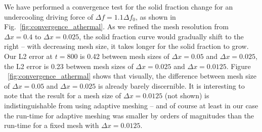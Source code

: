 \documentclass[preprint,12pt]{elsarticle}
\begin{document}
We have performed a convergence test for the solid fraction change for an undercooling driving force of $\Delta f=1.1\Delta f_0$, as shown in Fig.~\ref{fig:convergence_athermal}. %
As we refined the mesh resolution from $\Delta x=0.4$ to $\Delta x=0.025$, the solid fraction curve would gradually shift to the right -- with decreasing mesh size, it takes longer for the solid fraction to grow. %
Our L2 error at $t=800$ is 0.42 between mesh sizes of $\Delta x=0.05$ and $\Delta x=0.025$, the L2 error is 0.23 between mesh sizes of $\Delta x=0.025$ and $\Delta x=0.0125$.
Figure ~\ref{fig:convergence_athermal} shows that visually, the difference between mesh size of $\Delta x=0.05$ and $\Delta x=0.025$ is already barely discernible. It is interesting to note that the result for a mesh size of $\Delta x=0.0125$ (not shown) is indistinguishable from using adaptive meshing -- and of course at least in our case the run-time for adaptive meshing was smaller by orders of magnitudes than the run-time for a fixed mesh with $\Delta x=0.0125$. 
\end{document}
